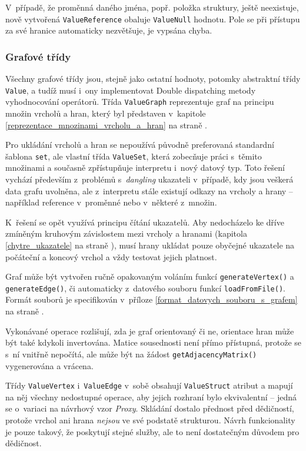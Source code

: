 \documentclass[11pt,twoside,a4paper]{book}
\begin{document}
V~případě, že proměnná daného jména, popř. položka struktury, ještě neexistuje, nově vytvořená \texttt{ValueReference} obaluje \texttt{ValueNull} hodnotu. Pole se při přístupu za své hranice automaticky nezvětšuje, je vypsána chyba.


\subsubsection{Grafové třídy}

Všechny grafové třídy jsou, stejně jako ostatní hodnoty, potomky abstraktní třídy \texttt{Value}, a tudíž musí i~ony implementovat Double dispatching metody vyhodnocování operátorů. Třída \texttt{ValueGraph} reprezentuje graf na principu množin vrcholů a hran, který byl představen v~kapitole \ref{reprezentace_mnozinami_vrcholu_a_hran} na straně \pageref{reprezentace_mnozinami_vrcholu_a_hran}.

Pro ukládání vrcholů a hran se nepoužívá původně preferovaná standardní šablona \texttt{set}, ale vlastní třída \texttt{ValueSet}, která zobecňuje práci s~těmito množinami a současně zpřístupňuje interpretu i~nový datový typ. Toto řešení vychází především z~problémů s~\textit{dangling} ukazateli v~případě, kdy jsou veškerá data grafu uvolněna, ale z~interpretu stále existují odkazy na vrcholy a hrany -- například reference v~proměnné nebo v~některé z~množin.

K~řešení se opět využívá principu čítání ukazatelů. Aby nedocházelo ke dříve zmíněným kruhovým závislostem mezi vrcholy a hranami (kapitola \ref{chytre_ukazatele} na straně \pageref{chytre_ukazatele}), musí hrany ukládat pouze obyčejné ukazatele na počáteční a koncový vrchol a vždy testovat jejich platnost.

Graf může být vytvořen ručně opakovaným voláním funkcí \texttt{generateVertex()} a \texttt{ge\-ne\-ra\-te\-Ed\-ge()}, či automaticky z~datového souboru funkcí \texttt{lo\-ad\-From\-Fi\-le()}. Formát souborů je specifikován v~příloze \ref{format_datovych_souboru_s_grafem} na straně \pageref{format_datovych_souboru_s_grafem}.

Vykonávané operace rozlišují, zda je graf orientovaný či ne, orientace hran může být také kdykoli invertována. Matice sousednosti není přímo přístupná, protože se s~ní vnitřně nepočítá, ale může být na žádost \texttt{getAdjacencyMatrix()} vygenerována a vrácena.

Třídy \texttt{ValueVertex} i~\texttt{ValueEdge} v~sobě obsahují \texttt{ValueStruct} atribut a mapují na něj všechny nedostupné operace, aby jejich rozhraní bylo ekvivalentní -- jedná se o~variaci na návrhový vzor \textit{Proxy}. Skládání dostalo přednost před dědičností, protože vrchol ani hrana \textit{nejsou} ve své podstatě strukturou. Návrh funkcionality je pouze takový, že poskytují stejné služby, ale to není dostatečným důvodem pro dědičnost.
\end{document}
